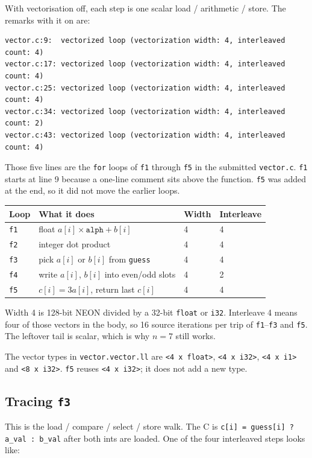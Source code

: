 \documentclass[11pt,a4paper]{article}
\begin{document}
With vectorisation off, each step is one scalar load / arithmetic /
store. The remarks with it on are:

\begin{lstlisting}[language={}]
vector.c:9:  vectorized loop (vectorization width: 4, interleaved count: 4)
vector.c:17: vectorized loop (vectorization width: 4, interleaved count: 4)
vector.c:25: vectorized loop (vectorization width: 4, interleaved count: 4)
vector.c:34: vectorized loop (vectorization width: 4, interleaved count: 2)
vector.c:43: vectorized loop (vectorization width: 4, interleaved count: 4)
\end{lstlisting}

Those five lines are the \texttt{for} loops of \texttt{f1} through
\texttt{f5} in the submitted \texttt{vector.c}. \texttt{f1} starts at
line 9 because a one-line comment sits above the function. \texttt{f5}
was added at the end, so it did not move the earlier loops.

{\small
\begin{tabular}{llll}
\hline
Loop & What it does & Width & Interleave \\
\hline
\texttt{f1} & float $a[i]\times\texttt{alph}+b[i]$ & 4 & 4 \\
\texttt{f2} & integer dot product & 4 & 4 \\
\texttt{f3} & pick $a[i]$ or $b[i]$ from \texttt{guess} & 4 & 4 \\
\texttt{f4} & write $a[i]$, $b[i]$ into even/odd slots & 4 & 2 \\
\texttt{f5} & $c[i]=3a[i]$, return last $c[i]$ & 4 & 4 \\
\hline
\end{tabular}
}

Width 4 is 128-bit NEON divided by a 32-bit \texttt{float} or
\texttt{i32}. Interleave 4 means four of those vectors in the body, so
16 source iterations per trip of \texttt{f1}--\texttt{f3} and
\texttt{f5}. The leftover
tail is scalar, which is why $n=7$ still works.

The vector types in \texttt{vector.vector.ll} are \texttt{<4 x float>},
\texttt{<4 x i32>}, \texttt{<4 x i1>} and \texttt{<8 x i32>}.
\texttt{f5} reuses \texttt{<4 x i32>}; it does not add a new type.

\subsection*{Tracing \texttt{f3}}

This is the load / compare / select / store walk. The C is
\texttt{c[i] = guess[i] ? a\_val : b\_val} after both ints are loaded.
One of the four interleaved steps looks like:
\end{document}

